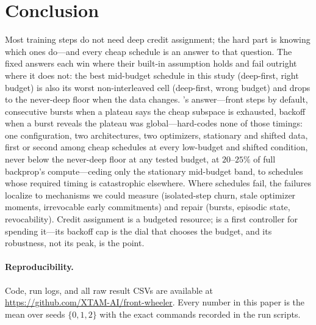 \section{Conclusion}
Most training steps do not need deep credit assignment; the hard part is
knowing which ones do---and every cheap schedule is an answer to that
question. The fixed answers each win where their built-in assumption holds
and fail outright where it does not: the best mid-budget schedule in this
study (deep-first, right budget) is also its worst non-interleaved cell
(deep-first, wrong budget) and drops to the never-deep floor when the data changes. \fw{}'s
answer---front steps by default, consecutive bursts when a plateau says the
cheap subspace is exhausted, backoff when a burst reveals the plateau was
global---hard-codes none of those timings: one configuration, two
architectures, two optimizers, stationary and shifted data, first or second
among cheap schedules at every low-budget and shifted condition, never
below the never-deep floor at any tested budget, at $20$--$25\%$ of full
backprop's compute---ceding only the stationary mid-budget band, to
schedules whose required timing is catastrophic elsewhere. Where schedules fail,
the failures localize to mechanisms we could measure (isolated-step churn,
stale optimizer moments, irrevocable early commitments) and repair (bursts,
episodic state, revocability). Credit assignment is a budgeted resource;
\fw{} is a first controller for spending it---its backoff cap is the dial
that chooses the budget, and its robustness, not its peak, is the point.

\paragraph{Reproducibility.} Code, run logs, and all raw result CSVs are
available at \url{https://github.com/XTAM-AI/front-wheeler}. Every number in
this paper is the mean over seeds $\{0,1,2\}$ with the exact commands
recorded in the run scripts.
